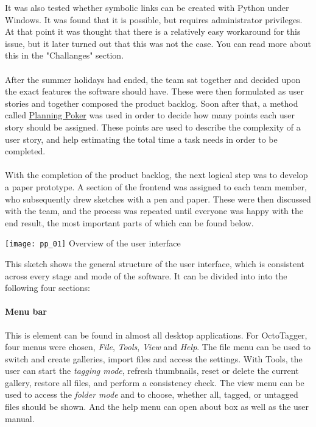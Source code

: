 It was also tested whether symbolic links can be created with Python under Windows. It was found that it is possible, but requires administrator privileges. At that point it was thought that there is a relatively easy workaround for this issue, but it later turned out that this was not the case. You can read more about this in the "Challanges" section. %

\paragraph{}
After the summer holidays had ended, the team sat together and decided upon the exact features the software should have. These were then formulated as user stories and together composed the product backlog. Soon after that, a method called \href{https://en.wikipedia.org/wiki/Planning_poker}{Planning Poker} was used in order to decide how many points each user story should be assigned. These points are used to describe the complexity of a user story, and help estimating the total time a task needs in order to be completed.

\paragraph{}
With the completion of the product backlog, the next logical step was to develop a paper prototype. A section of the frontend was assigned to each team member, who subsequently drew sketches with a pen and paper. These were then discussed with the team, and the process was repeated until everyone was happy with the end result, the most important parts of which can be found below.

\begin{center}
\texttt{[image: pp\_01]}
\small{Overview of the user interface}
\end{center}

This sketch shows the general structure of the user interface, which is consistent across every stage and mode of the software. It can be divided into into the following four sections:

\paragraph{Menu bar} This is element can be found in almost all desktop applications. For OctoTagger, four menus were chosen, \textit{File}, \textit{Tools}, \textit{View} and \textit{Help}. The file menu can be used to switch and create galleries, import files and access the settings. With Tools, the user can start the \textit{tagging mode}, refresh thumbnails, reset or delete the current gallery, restore all files, and perform a consistency check. The view menu can be used to access the \textit{folder mode} and to choose, whether all, tagged, or untagged files should be shown. And the help menu can open about box as well as the user manual.

